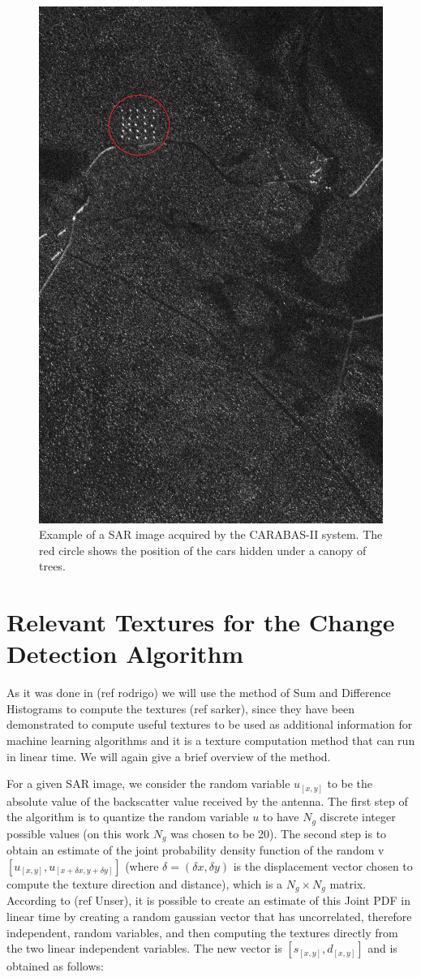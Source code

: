 \begin{figure}[ht]
    \centering
    \includegraphics[width=0.45\linewidth]{Chapter7/exemplo_carabas.jpg}
    \caption{ Example of a SAR image acquired by the CARABAS-II system.
    The red circle shows the position of the cars hidden under a canopy of trees.}
    \label{fig:exemplo_carabas}
\end{figure}

\section{Relevant Textures for the Change Detection Algorithm}
As it was done in (ref rodrigo) we will use the method of Sum and Difference Histograms to compute the textures (ref sarker), since they have been demonstrated to compute 
useful textures to be used as additional information for machine learning algorithms and it is a texture computation method that can run in linear time. We will again give a brief overview of the method.

For a given SAR image, we consider the random variable $u_{[x, y]}$ to be the absolute value of the backscatter value received by the antenna. The first step of the algorithm is to 
quantize the random variable $u$ to have $N_g$ discrete integer possible values (on this work $N_g$ was chosen to be 20). The second step is to obtain an estimate of the joint probability density function of the random v $[u_{[x,y]}, u_{[x+\delta x, y+\delta y]}]$ (where $\delta = (\delta x, \delta y)$ is the displacement vector 
chosen to compute the texture direction and distance),
which is a $N_g \times N_g$ matrix. According to (ref Unser), it is possible to create an estimate of this Joint PDF in linear time by creating a random gaussian vector that has uncorrelated, therefore independent, random variables, and then computing the textures 
directly from the two linear independent variables. The new vector is $[s_{[x,y]}, d_{[x, y]}]$ and is obtained as follows:


